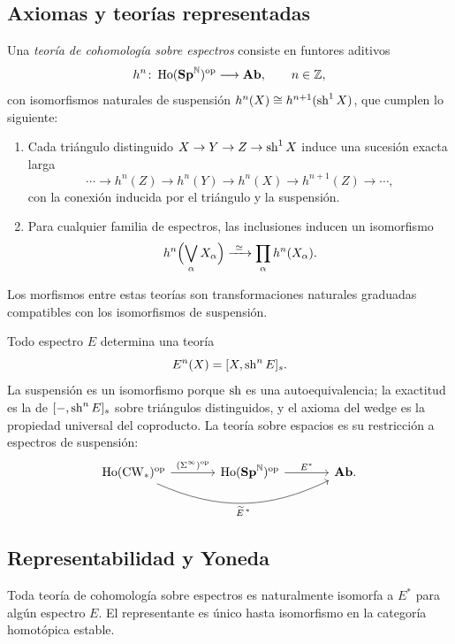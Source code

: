 \subsection{Axiomas y teorías representadas}
\begin{defi}\label{defi:c20-cohomologia-espectros}
Una \emph{teoría de cohomología sobre espectros} consiste en funtores aditivos
\[
h^n\colon\operatorname{Ho}(\mathbf{Sp}^{\mathbb N})^{\mathrm{op}}\longrightarrow\mathbf{Ab},
\qquad n\in\mathbb Z,
\]
con isomorfismos naturales de suspensión $h^n(X)\cong h^{n+1}(\operatorname{sh}^1X)$, que cumplen lo siguiente:
\begin{enumerate}
\item Cada triángulo distinguido $X\to Y\to Z\to\operatorname{sh}^1X$ induce una sucesión exacta larga
\[
\cdots\longrightarrow h^n(Z)\longrightarrow h^n(Y)
\longrightarrow h^n(X)\longrightarrow h^{n+1}(Z)\longrightarrow\cdots,
\]
con la conexión inducida por el triángulo y la suspensión.
\item Para cualquier familia de espectros, las inclusiones inducen un isomorfismo
\[
h^n\Bigl(\bigvee_\alpha X_\alpha\Bigr)
\xrightarrow{\ \simeq\ }\prod_\alpha h^n(X_\alpha).
\]
\end{enumerate}
Los morfismos entre estas teorías son transformaciones naturales graduadas compatibles con los isomorfismos de suspensión.
\end{defi}

Todo espectro $E$ determina una teoría
\[
E^n(X)=[X,\operatorname{sh}^nE]_s.
\]
La suspensión es un isomorfismo porque $\operatorname{sh}$ es una autoequivalencia; la exactitud es la de $[-,\operatorname{sh}^nE]_s$ sobre triángulos distinguidos, y el axioma del wedge es la propiedad universal del coproducto. La teoría sobre espacios es su restricción a espectros de suspensión:
\[
\begin{tikzcd}[column sep=large,row sep=large]
\Ho(\mathrm{CW}_*)^{\mathrm{op}}
\arrow[r,"(\Sigma^\infty)^{\mathrm{op}}"]
\arrow[rr,bend right=25,"\widetilde E^{\,*}"']
&\Ho(\Sp^{\mathbb N})^{\mathrm{op}}\arrow[r,"E^*"]&\Ab.
\end{tikzcd}
\]

\subsection{Representabilidad y Yoneda}
\begin{teo}\label{teo:c20-brown-espectros}
Toda teoría de cohomología sobre espectros es naturalmente isomorfa a $E^*$ para algún espectro $E$. El representante es único hasta isomorfismo en la categoría homotópica estable.
\end{teo}

